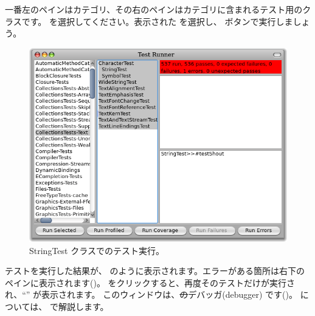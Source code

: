 \documentclass[a4paper,10pt,twoside]{book}
\begin{document}

一番左のペインはカテゴリ、その右のペインはカテゴリに含まれるテスト用のクラスです。
を選択してください。表示された  を選択し、 ボタンで実行しましょう。

\begin{figure}[hbt]
\centerline {\includegraphics[width=\textwidth]{testRunnerOnStringTest}}
\caption{StringTest クラスでのテスト実行。
}
\end{figure}

テストを実行した結果が、 のように表示されます。エラーがある箇所は右下のペインに表示されます()。
 をクリックすると、再度そのテストだけが実行され、``'' が表示されます。
このウィンドウは、\st のデバッガ(debugger) です()。
 については、 で解説します。
\end{document}
